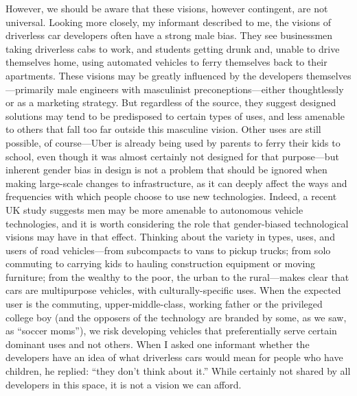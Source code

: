 However, we should be aware that these visions, however contingent,
are not universal. Looking more closely, my informant described to me, the visions
of driverless car developers
often have a strong male bias. They see businessmen
taking driverless cabs to work, and students getting drunk and, unable
to drive themselves home, using automated vehicles to ferry themselves
back to their apartments. These visions may be greatly influenced by
the developers themselves---primarily male engineers with masculinist
preconeptions---either thoughtlessly or as a marketing strategy. But
regardless of the source, they suggest designed solutions may tend to
be predisposed to certain types of uses, and less amenable to others
that fall too far outside this masculine vision. Other uses are still
possible, of course---Uber is already being used by parents to ferry
their kids to school, even though it was almost certainly not designed
for that
purpose\cite{???-http://healthland.time.com/2013/11/14/for-more-parents-its-uber-to-the-rescue/--http://www.nytimes.com/2013/09/26/fashion/moms-van-is-called-uber.html?_r=0}---but
inherent gender bias in design is not a problem that should be ignored
when making large-scale changes to infrastructure, as it can deeply
affect the ways and frequencies with which people choose to use new
technologies. Indeed, a recent UK study suggests men may be more
amenable to autonomous vehicle technologies, and it is worth
considering the role that gender-biased technological visions may have
in that
effect\cite{???-http://www.nytimes.com/2013/09/26/fashion/moms-van-is-called-uber.html?_r=0}.
Thinking about the variety in types, uses, and users of road vehicles---from
subcompacts to vans to pickup trucks; from solo commuting to carrying kids to
hauling construction equipment or moving furniture; from the wealthy
to the poor, the urban to the rural---makes clear that cars are
multipurpose vehicles, with culturally-specific uses. When the
expected user is the commuting, upper-middle-class, working father or
the privileged college boy (and the opposers of the technology are
branded by some, as we saw, as ``soccer moms''), we risk developing
vehicles that preferentially serve certain dominant uses and not
others. When I asked one informant whether the developers have an idea
of what driverless cars would mean for people who have children, he
replied:  ``they don't think about it.'' While certainly not shared by
all developers in this space, it is not a vision we can afford.



